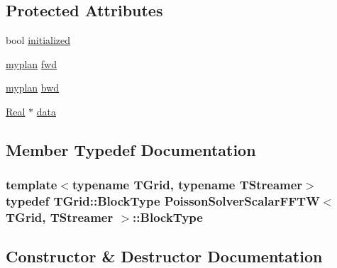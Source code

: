 \subsection*{Protected Attributes}
\begin{DoxyCompactItemize}
\item 
bool \hyperlink{class_poisson_solver_scalar_f_f_t_w_a14ffa693193fcc1d5391c452dcf11d34}{initialized}
\item 
\hyperlink{_poisson_solver_scalar_f_f_t_w_8h_ac66f8d6f8b8f126b5905022a063b968e}{myplan} \hyperlink{class_poisson_solver_scalar_f_f_t_w_a7773ce95a3312d7a5213c060586aed4b}{fwd}
\item 
\hyperlink{_poisson_solver_scalar_f_f_t_w_8h_ac66f8d6f8b8f126b5905022a063b968e}{myplan} \hyperlink{class_poisson_solver_scalar_f_f_t_w_a01d910395049c4252d4924baa032b13d}{bwd}
\item 
\hyperlink{_h_d_f5_dumper_8h_a445a5f0e2a34c9d97d69a3c2d1957907}{Real} $\ast$ \hyperlink{class_poisson_solver_scalar_f_f_t_w_ae4f5219ed358cd8d227084a7fa92e686}{data}
\end{DoxyCompactItemize}


\subsection{Member Typedef Documentation}
\hypertarget{class_poisson_solver_scalar_f_f_t_w_ad496c7981a6167c70ccd329d4b37888d}{}
\subsubsection[{Block\+Type}]{\setlength{\rightskip}{0pt plus 5cm}template$<$typename T\+Grid, typename T\+Streamer$>$ typedef T\+Grid\+::\+Block\+Type {\bf Poisson\+Solver\+Scalar\+F\+F\+T\+W}$<$ T\+Grid, T\+Streamer $>$\+::{\bf Block\+Type}\hspace{0.3cm}{\ttfamily [protected]}}\label{class_poisson_solver_scalar_f_f_t_w_ad496c7981a6167c70ccd329d4b37888d}


\subsection{Constructor \& Destructor Documentation}
\hypertarget{class_poisson_solver_scalar_f_f_t_w_ad30e877f71d90ed725b4f6dc073d15b1}{}
